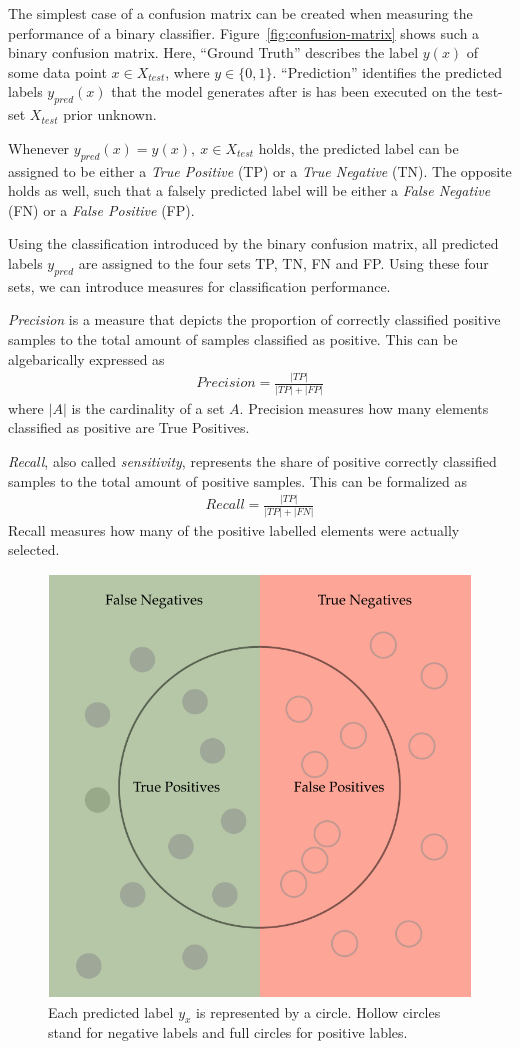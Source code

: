 The simplest case of a confusion matrix can be created when measuring the performance of a binary classifier.
Figure~\ref{fig:confusion-matrix} shows such a binary confusion matrix.
Here, ``Ground Truth'' describes the label \(y(x)\) of some data point \(x \in X_{test}\), where \(y \in \{0, 1\}\).
``Prediction'' identifies the predicted labels \(y_{pred}(x)\) that the model generates after is has been executed on the test-set \(X_{test}\) prior unknown.

Whenever \(y_{pred}(x) = y(x),~x \in X_{test}\) holds, the predicted label can be assigned to be either a \emph{True Positive} (TP) or a \emph{True Negative} (TN).
The opposite holds as well, such that a falsely predicted label will be either a \emph{False Negative} (FN) or a \emph{False Positive} (FP).

Using the classification introduced by the binary confusion matrix, all predicted labels \(y_{pred}\) are assigned to the four sets TP, TN, FN and FP.
Using these four sets, we can introduce measures for classification performance.

\emph{Precision} is a measure that depicts the proportion of correctly classified positive samples to the total amount of samples classified as positive.\cite[p.4]{THA18} This can be algebarically expressed as
\begin{align}
    Precision = \frac{|TP|}{|TP| + |FP|}
\end{align}
where \(|A|\) is the cardinality of a set \(A\). Precision measures how many elements classified as positive are True Positives.

\emph{Recall}, also called \emph{sensitivity}, represents the
share of positive correctly classified samples to the total amount of positive samples.\cite[p.3]{THA18} This can be formalized as
\begin{align}
    Recall = \frac{|TP|}{|TP| + |FN|}
\end{align}
Recall measures how many of the positive labelled elements were actually selected.

\begin{figure}[h]
    \centering
    \includegraphics[width=.5\textwidth]{images/precision-and-recall}
    \caption{Each predicted label \(y_{x}\) is represented by a circle. Hollow circles stand for negative labels and full circles for positive lables.  }
    \label{fig:precision-and-recall}
\end{figure}

